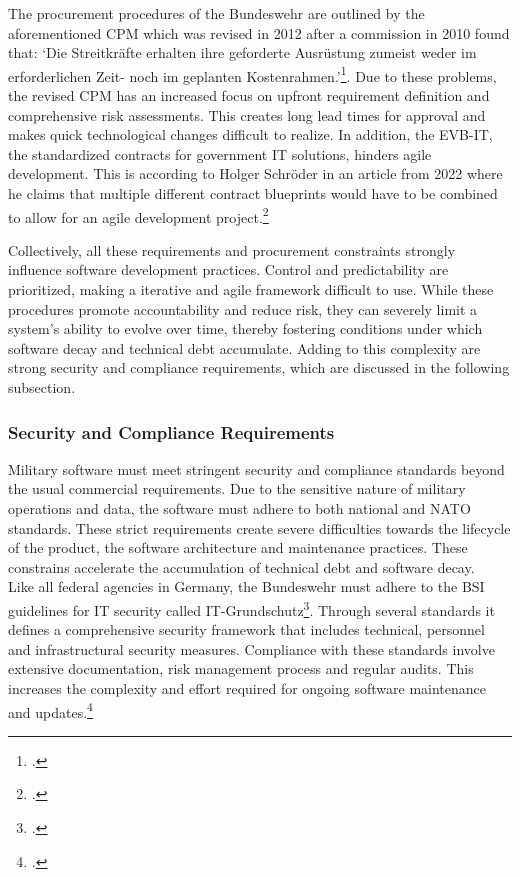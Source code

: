 The procurement procedures of the Bundeswehr are outlined by the aforementioned \ac{CPM} which was revised in 2012 after a commission in 2010 found that: 
`Die Streitkräfte erhalten ihre geforderte Ausrüstung zumeist weder im erforderlichen Zeit- noch im geplanten Kostenrahmen.'\footcite[36]{strukturkommissionderbundeswehrBerichtStrukturkommissionBundeswehr2010}.
Due to these problems, the revised \ac{CPM} has an increased focus on upfront requirement definition and comprehensive risk assessments. This creates long lead times
for approval and makes quick technological changes difficult to realize.
In addition, the \ac{EVB-IT}, the standardized contracts for government IT solutions, hinders agile development. This is according to Holger Schröder in an article  from 2022
where he claims that multiple different contract blueprints would have to be combined to allow for an agile development project.\footcite{schroederUngeeignetFuerAgile2022}

Collectively, all these requirements and procurement constraints strongly influence software development practices. Control and predictability are prioritized, making
a iterative and agile framework difficult to use. While these procedures promote accountability and reduce risk, they can severely limit a system's ability to evolve over time, thereby fostering conditions under which software decay and technical debt accumulate. 
Adding to this complexity are strong security and compliance requirements, which are discussed in the following subsection.

\subsubsection{Security and Compliance Requirements}
Military software must meet stringent security and compliance standards beyond the usual commercial requirements. Due to the sensitive nature of military operations and data,
the software must adhere to both national and NATO standards. These strict requirements create severe difficulties 
towards the lifecycle of the product, the software architecture and maintenance practices. These constrains accelerate the accumulation of technical debt and software decay.\\

Like all federal agencies in Germany, the Bundeswehr must adhere to the \ac{BSI} guidelines for IT security called IT-Grundschutz\footcite{bundesamtfuersicherheitinderinformationstechnikBSIFAQ}. Through several standards it defines a comprehensive security framework
that includes technical, personnel and infrastructural security measures. Compliance with these standards involve extensive documentation, risk management process and regular audits. This increases the complexity and effort required for ongoing software maintenance and updates.\footcite{bundesamtfuersicherheitinderinformationstechnikBSIStandards}\\

